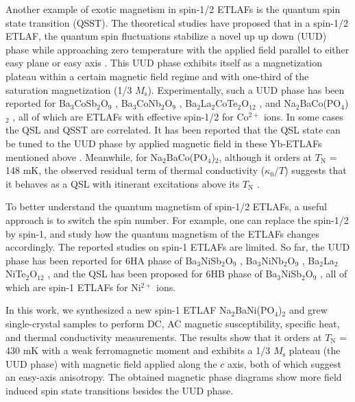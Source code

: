 \documentclass[aps,twocolumn,superscriptaddress,showpacs]{revtex4-1}
\begin{document}
Another example of exotic magnetism in spin-1/2 ETLAFs is the quantum spin state transition (QSST). The theoretical studies have proposed that in a spin-1/2 ETLAF, the quantum spin fluctuations stabilize a novel up up down (UUD) phase while approaching zero temperature with the applied field parallel to either easy plane or easy axis \cite{chubukov1991quantum, miyashita1986magnetic}. This UUD phase exhibits itself as a magnetization plateau within a certain magnetic field regime and with one-third of the saturation magnetization (1/3 $M_{\text{s}}$). Experimentally, such a UUD phase has been reported for Ba$_3$CoSb$_2$O$_9$ \cite{shirata2012experimental, susuki2013magnetization, zhou2012successive, PhysRevB.103.184425}, Ba$_3$CoNb$_2$O$_9$ \cite{PhysRevB.89.104420, PhysRevB.90.014403}, Ba$_2$La$_2$CoTe$_2$O$_{12}$ \cite{PhysRevB.98.174406}, and Na$_2$BaCo(PO$_4$)$_2$ \cite {li2020possible}, all of which are ETLAFs with effective spin-1/2 for Co$^{2+}$ ions. In some cases the QSL and QSST are correlated. It has been reported that the QSL state can be tuned to the UUD phase by applied magnetic field in these Yb-ETLAFs mentioned above \cite{bordelon2019field, ma2020spin, ranjith2019anisotropic, xing2019field}. Meanwhile, for Na$_2$BaCo(PO$_4$)$_2$, although it orders at $T_{\text{N}}$ = 148 mK, the observed residual term of thermal conductivity ($\kappa_0$/$T$) suggests that it behaves as a QSL with itinerant excitations above its $T_{\text{N}}$ \cite{li2020possible}.

To better understand the quantum magnetism of spin-1/2 ETLAFs, a useful approach is to switch the spin number. For example, one can replace the spin-1/2 by spin-1, and study how the quantum magnetism of the ETLAFs changes accordingly. The reported studies on spin-1 ETLAFs are limited. So far, the UUD phase has been reported for 6HA phase of Ba$_3$NiSb$_2$O$_9$ \cite{shirata2011quantum}, Ba$_3$NiNb$_2$O$_9$ \cite{PhysRevLett.109.257205}, Ba$_2$La$_2$NiTe$_2$O$_{12}$ \cite{PhysRevB.100.064417}, and the QSL has been proposed for 6HB phase of Ba$_3$NiSb$_2$O$_9$ \cite{PhysRevLett.107.197204, PhysRevLett.109.016402, PhysRevB.93.214432, PhysRevB.95.060402}, all of which are spin-1 ETLAFs for Ni$^{2+}$ ions.

In this work, we synthesized a new spin-1 ETLAF Na$_2$BaNi(PO$_4$)$_2$ and grew single-crystal samples to perform DC, AC magnetic susceptibility, specific heat, and thermal conductivity measurements. The results show that it orders at $T_{\text{N}}$ = 430 mK with a weak ferromagnetic moment and exhibits a 1/3 $M_{\text{s}}$ plateau (the UUD phase) with magnetic field applied along the $c$ axis, both of which suggest an easy-axis anisotropy. The obtained magnetic phase diagrams show more field induced spin state transitions besides the UUD phase.
\end{document}
